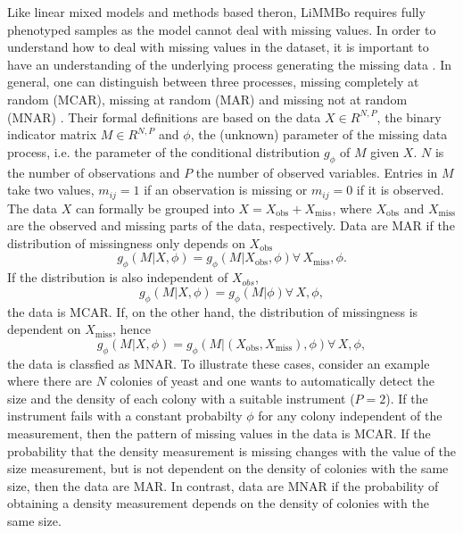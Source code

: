 Like linear mixed models and methods based theron, LiMMBo requires fully phenotyped samples as the model cannot deal with missing values. In order to understand how to deal with missing values in the dataset, it is important to have an understanding of the underlying process generating the missing data \citep{Rubin1976}. In general, one can distinguish between three processes, missing completely at random (MCAR), missing at random (MAR) and missing not at random (MNAR) \citep{Little2002}. Their formal definitions are based on the data \(X  \in R^{N,P}\),  the binary indicator matrix \(M  \in R^{N,P}\)  and \(\phi\), the (unknown) parameter of the missing data process, i.e. the parameter of the conditional distribution \(g_\phi\) of \(M\) given \(X\). \(N\) is the number of observations and \(P\) the number of observed variables. Entries in \(M\) take two values,  \(m_{ij} = 1 \) if an observation is missing or  \(m_{ij} = 0\) if it is observed. The data \(X\) can formally be grouped into \(X=X_\text{obs} + X_\text{miss}\), where \(X_\text{obs}\) and  \(X_\text{miss}\) are the observed and missing parts of the data, respectively. Data are MAR if the distribution of missingness only depends on \(X_{\text{obs}}\)
\begin{equation}
g_\phi(M | X, \phi) =  g_\phi(M | X_{\text{obs}}, \phi)  \forall \, X_\text{miss}, \phi.
\end{equation}
If the distribution is also independent of \(X_{obs}\), 
\begin{equation}
g_\phi(M | X, \phi) =  g_\phi(M | \phi) \forall \, X, \phi,
\end{equation}
the data is MCAR. If, on the other hand, the distribution of missingness is dependent on \(X_{\text{miss}}\), hence
\begin{equation}
g_\phi(M | X, \phi) =  g_\phi(M | (X_{\text{obs}}, X_{\text{miss}}),\phi) \forall \, X, \phi,
\end{equation}
the data is classfied as MNAR. To illustrate these cases, consider an example where there are \(N\) colonies of yeast and one wants to automatically detect the size and the density of each colony with a suitable instrument (\(P=2\)). If the instrument fails with a constant probabilty \(\phi\) for any colony independent of the measurement, then the pattern of missing values in the data is MCAR. If the probability that the density measurement is missing changes with the value of the size measurement, but is not dependent on the density of colonies with the same size, then the data are MAR. In contrast, data are MNAR if the probability of obtaining a density measurement depends on the density of colonies with the same size. 

